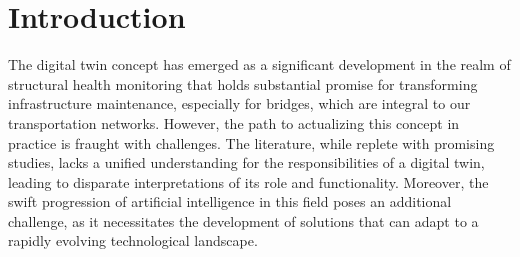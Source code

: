 \section{Introduction}

The digital twin concept has emerged as a significant development in the realm of structural health monitoring that holds substantial promise for transforming infrastructure maintenance, especially for bridges, which are integral to our transportation networks. %
However, the path to actualizing this concept in practice is fraught with challenges. 
The literature, while replete with promising studies, lacks a unified understanding for the responsibilities of a digital twin, leading to disparate interpretations of its role and functionality. 
Moreover, the swift progression of artificial intelligence in this field poses an additional challenge, as it necessitates the development of solutions that can adapt to a rapidly evolving technological landscape.

